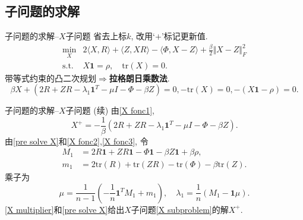 \documentclass{beamer}
\newcommand{\trace}{\mathrm{tr}}
\newcommand{\st}{\mathrm{s.t.}}
\newcommand{\one}{\mathbf{1}}
\begin{document}
\subsection{子问题的求解}
\begin{frame}{子问题的求解--$X$子问题}
省去上标$k$, 改用`$+$'标记更新值. 
\begin{equation}
	\begin{array}{rl}
		\min\limits_X & 2\langle X,R\rangle+\langle Z,XR\rangle-\langle\Phi,X-Z\rangle+\frac{\beta}{2}\Vert X-Z\Vert_F^2\\
		\st & X\one=\rho,\quad\trace(X)=0.
	\end{array}
	\label{X subproblem}
\end{equation}
带等式约束的凸二次规划\pause$\Rightarrow$\textbf{拉格朗日乘数法}.
\begin{subequations}
	\begin{equation}
	\beta X+(2R+ZR-\lambda_1\one^T-\mu I-\Phi-\beta Z)=0,\label{X fonc1}
	\end{equation}
	\begin{equation}
	-\trace(X)=0,\label{X fonc2}
	\end{equation}
	\begin{equation}
	-(X\one-\rho)=0.\label{X fonc3}
	\end{equation}
\end{subequations}
\end{frame}

\begin{frame}{子问题的求解--$X$子问题 (续)}
由\eqref{X fonc1}, 
\begin{equation}
	X^+=-\frac{1}{\beta}(2R+ZR-\lambda_1\one^T-\mu I-\Phi-\beta Z).\label{pre solve X}
\end{equation}
由\eqref{pre solve X}和\eqref{X fonc2},\eqref{X fonc3}, 令
$$\begin{aligned}
	M_1&=2R\one+ZR\one-\Phi\one-\beta Z\one+\beta\rho,\\
	m_1&=2\trace(R)+\trace(ZR)-\trace(\Phi)-\beta\trace(Z).
\end{aligned}$$
乘子为
\begin{equation}
	\mu=\frac{1}{n-1}\left(-\frac{1}{n}\one^TM_1+m_1\right),\quad\lambda_1=\frac{1}{n}(M_1-\one\mu).\label{X multiplier}
\end{equation}
\eqref{X multiplier}和\eqref{pre solve X}给出$X$子问题\eqref{X subproblem}的解$X^+$.
\end{frame}
\end{document}
